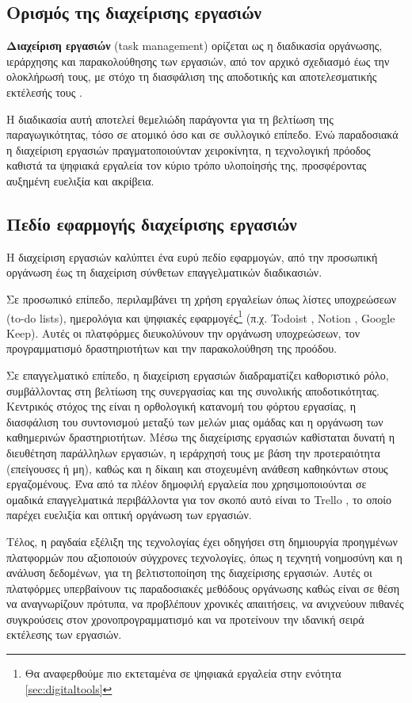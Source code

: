         \subsection{Ορισμός της διαχείρισης εργασιών}
            \textbf{Διαχείριση εργασιών} (task management) ορίζεται ως η διαδικασία οργάνωσης, ιεράρχησης και παρακολούθησης των εργασιών, από τον αρχικό σχεδιασμό έως την ολοκλήρωσή τους, με στόχο τη διασφάλιση της αποδοτικής και αποτελεσματικής εκτέλεσής τους \cite{PMBOK}.

            Η διαδικασία αυτή αποτελεί θεμελιώδη παράγοντα για τη βελτίωση της παραγωγικότητας, τόσο σε ατομικό όσο και σε συλλογικό επίπεδο. Ενώ παραδοσιακά η διαχείριση εργασιών πραγματοποιούνταν χειροκίνητα, η τεχνολογική πρόοδος καθιστά τα ψηφιακά εργαλεία τον κύριο τρόπο υλοποίησής της, προσφέροντας αυξημένη ευελιξία και ακρίβεια.

        \subsection{Πεδίο εφαρμογής διαχείρισης εργασιών}
            Η διαχείριση εργασιών καλύπτει ένα ευρύ πεδίο εφαρμογών, από την προσωπική οργάνωση έως τη διαχείριση σύνθετων επαγγελματικών διαδικασιών.

            Σε προσωπικό επίπεδο, περιλαμβάνει τη χρήση εργαλείων όπως λίστες υποχρεώσεων (to-do lists), ημερολόγια και ψηφιακές εφαρμογές\footnote{Θα αναφερθούμε πιο εκτεταμένα σε ψηφιακά εργαλεία στην ενότητα \ref{sec:digitaltools}} (π.χ. Todoist \cite{Todoist}, Notion \cite{Notion}, Google Keep). Αυτές οι πλατφόρμες διευκολύνουν την οργάνωση υποχρεώσεων, τον προγραμματισμό δραστηριοτήτων και την παρακολούθηση της προόδου.

            Σε επαγγελματικό επίπεδο, η διαχείριση εργασιών διαδραματίζει καθοριστικό ρόλο, συμβάλλοντας στη βελτίωση της συνεργασίας και της συνολικής αποδοτικότητας. Κεντρικός στόχος της είναι η ορθολογική κατανομή του φόρτου εργασίας, η διασφάλιση του συντονισμού μεταξύ των μελών μιας ομάδας και η οργάνωση των καθημερινών δραστηριοτήτων.  Μέσω της διαχείρισης εργασιών καθίσταται δυνατή η διευθέτηση παράλληλων εργασιών, η ιεράρχησή τους με βάση την προτεραιότητα (επείγουσες ή μη), καθώς και η δίκαιη και στοχευμένη ανάθεση καθηκόντων στους εργαζομένους. Ένα από τα πλέον δημοφιλή εργαλεία που χρησιμοποιούνται σε ομαδικά επαγγελματικά περιβάλλοντα για τον σκοπό αυτό είναι το Trello \cite{Trello}, το οποίο παρέχει ευελιξία και οπτική οργάνωση των εργασιών.

            Τέλος, η ραγδαία εξέλιξη της τεχνολογίας έχει οδηγήσει στη δημιουργία προηγμένων πλατφορμών που αξιοποιούν σύγχρονες τεχνολογίες, όπως η τεχνητή νοημοσύνη και η ανάλυση δεδομένων, για τη βελτιστοποίηση της διαχείρισης εργασιών. Αυτές οι πλατφόρμες υπερβαίνουν τις παραδοσιακές μεθόδους οργάνωσης καθώς είναι σε θέση να αναγνωρίζουν πρότυπα, να προβλέπουν χρονικές απαιτήσεις, να ανιχνεύουν πιθανές συγκρούσεις στον χρονοπρογραμματισμό και να προτείνουν την ιδανική σειρά εκτέλεσης των εργασιών.

